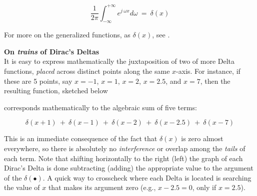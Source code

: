 \begin{svgraybox}
	\begin{equation}
		\frac{1}{2\pi} \int_{ -\infty}^{ +\infty} e^{ j\ \omega x} d\omega \ =\ \delta(x)
	\end{equation}	

	For more on the generalized functions, as \(\delta(x)\), see \cite{Saichev:2013}.
\end{svgraybox}	




\newpage
\begin{svgraybox}
	{\bf{On \textit{trains} of Dirac's Deltas}}
	\\

	It is easy to express mathematically the juxtaposition of two of more Delta functions, \textit{placed} across distinct points along the same \(x\)-axis. For instance, if these are 5 points, say \(x = - 1\), \(x =	1\), \(x = 2\), \(x = 2.5\), and \(x = 7\), then the resulting function, sketched below
	
  
  corresponds mathematically to the algebraic sum of five terms:

  \begin{equation}
	\delta(x + 1)\ +\ \delta(x - 1)\ +\ \delta(x - 2)\ +\ \delta(x - 2.5)\ +\ \delta(x - 7)
  \end{equation}
  
  This is an immediate consequence of the fact that \(\delta(x)\) is zero almost everywhere, so there is absolutely no \textit{interference} or overlap among the \textit{tails} of each term. Note that shifting horizontally to the right (left) the graph of each Dirac's Delta is done subtracting (adding) the appropriate value to the argument of the \(\delta( \bullet )\). A quick way to crosscheck where each Delta is located is searching the value of $x$ that makes its argument zero (e.g., \(x - 2.5 = 0\), only if \(x = 2.5\)).

\end{svgraybox}	
 




